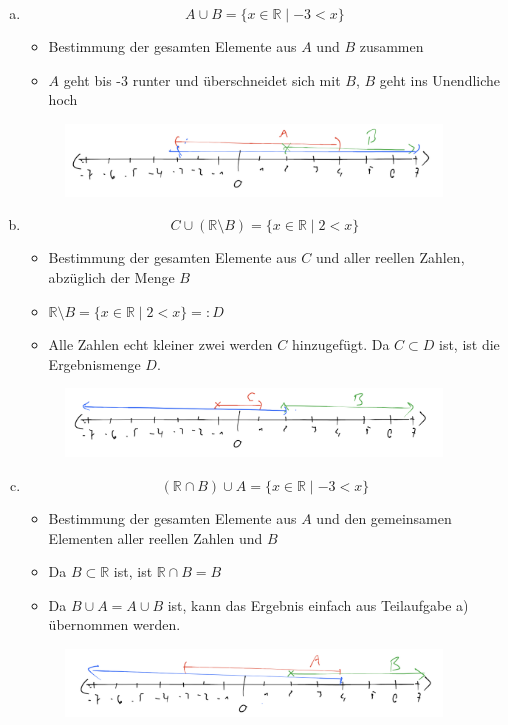 \documentclass{standalone}
\begin{document}
\begin{enumerate}[a)]
    \item $$ A \cup B = \{x \in \mathbb{R} \mid -3 < x\} $$
    \begin{itemize}
        \item Bestimmung der gesamten Elemente aus $A$ und $B$ zusammen
        \item $A$ geht bis -3 runter und überschneidet sich mit $B$, $B$ geht ins Unendliche hoch
    \end{itemize}
    \begin{figure}[htpb]
        \centering
        \includegraphics[width=10cm]{img/2_6_a}
    \end{figure}
    \FloatBarrier
    
    \item $$ C \cup (\mathbb{R} \setminus B) = \{x \in \mathbb{R} \mid 2 < x\} $$
    \begin{itemize}
        \item Bestimmung der gesamten Elemente aus $C$ und aller reellen Zahlen, abzüglich der Menge $B$
        \item $ \mathbb{R} \setminus B = \{x \in \mathbb{R} \mid 2 < x\} =: D $
        \item Alle Zahlen echt kleiner zwei werden $C$ hinzugefügt. Da $C \subset D$ ist, ist die Ergebnismenge $D$.
    \end{itemize}
    \begin{figure}[htpb]
        \centering
        \includegraphics[width=10cm]{img/2_6_b}
    \end{figure}
    \FloatBarrier

    \item $$ (\mathbb{R} \cap B) \cup A = \{x \in \mathbb{R} \mid -3 < x\}$$
    \begin{itemize}
        \item Bestimmung der gesamten Elemente aus $A$ und den gemeinsamen Elementen aller reellen Zahlen und $B$
        \item Da $B \subset \mathbb{R}$ ist, ist $\mathbb{R} \cap B = B$
        \item Da $B \cup A = A \cup B$ ist, kann das Ergebnis einfach aus Teilaufgabe a) übernommen werden.
    \end{itemize}
    \begin{figure}[htpb]
        \centering
        \includegraphics[width=10cm]{img/2_6_c}
    \end{figure}
    \FloatBarrier


\end{enumerate}
\end{document}
